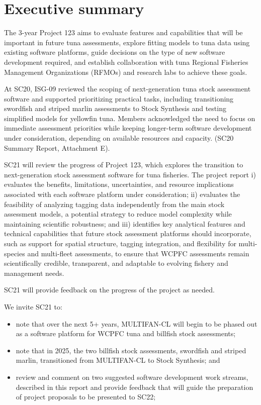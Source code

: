 \documentclass{SCreport}
\begin{document}
\wcpfctitlepage

\tableofcontents
\newpage

\section{Executive summary}

The 3-year Project 123 aims to evaluate features and capabilities that will be
important in future tuna assessments, explore fitting models to tuna data using
existing software platforms, guide decisions on the type of new software
development required, and establish collaboration with tuna Regional Fisheries
Management Organizations (RFMOs) and research labs to achieve these goals.

At SC20, ISG-09 reviewed the scoping of next-generation tuna stock assessment
software and supported prioritizing practical tasks, including transitioning
swordfish and striped marlin assessments to Stock Synthesis and testing
simplified models for yellowfin tuna. Members acknowledged the need to focus on
immediate assessment priorities while keeping longer-term software development
under consideration, depending on available resources and capacity. (SC20
Summary Report, Attachment E).

SC21 will review the progress of Project 123, which explores the transition to
next-generation stock assessment software for tuna fisheries. The project report
i) evaluates the benefits, limitations, uncertainties, and resource implications
associated with each software platform under consideration; ii) evaluates the
feasibility of analyzing tagging data independently from the main stock
assessment models, a potential strategy to reduce model complexity while
maintaining scientific robustness; and iii) identifies key analytical features
and technical capabilities that future stock assessment platforms should
incorporate, such as support for spatial structure, tagging integration, and
flexibility for multi-species and multi-fleet assessments, to ensure that WCPFC
assessments remain scientifically credible, transparent, and adaptable to
evolving fishery and management needs.

SC21 will provide feedback on the progress of the project as needed.

\vspace{4ex}

We invite SC21 to:

\begin{itemize}
  \item note that over the next 5+ years, MULTIFAN-CL will begin to be phased
  out as a software platform for WCPFC tuna and billfish stock assessments;
  \item note that in 2025, the two billfish stock assessments, swordfish and
  striped marlin, transitioned from MULTIFAN-CL to Stock Synthesis; and
  \item review and comment on two suggested software development work streams,
  described in this report and provide feedback that will guide the preparation
  of project proposals to be presented to SC22;
\end{itemize}
\end{document}
